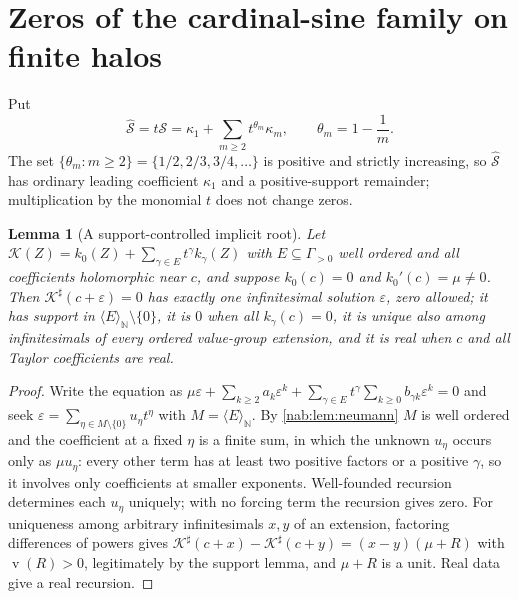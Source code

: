 \documentclass[11pt,letterpaper]{article}
\newtheorem{lemma}[lemma]{Lemma}
\theoremstyle{definition}
\theoremstyle{remark}
\newcommand{\N}{\mathbb N}
\newcommand{\val}{\operatorname{v}}
\newcommand{\angles}[1]{\langle #1\rangle_{\N}}
\numberwithin{equation}{section}
\begin{document}
\section{Zeros of the cardinal-sine family on finite halos}
\label{nab:pl:sec:zeros}

Put
\begin{equation}\label{nab:pl:eq:normalize}
 \widehat{\mathcal S}=t\mathcal S=\kappa_1+\sum_{m\geq2}t^{\theta_m}\kappa_m,
 \qquad\theta_m=1-\frac1m .
\end{equation}
The set $\{\theta_m:m\geq2\}=\{1/2,2/3,3/4,\ldots\}$ is positive and strictly
increasing, so $\widehat{\mathcal S}$ has ordinary leading coefficient
$\kappa_1$ and a positive-support remainder; multiplication by the monomial $t$
does not change zeros.

\begin{lemma}[A support-controlled implicit root]\label{nab:pl:lem:implicit}
Let $\mathcal K(Z)=k_0(Z)+\sum_{\gamma\in E}t^\gamma k_\gamma(Z)$ with
$E\subseteq\Gamma_{>0}$ well ordered and all coefficients holomorphic near $c$,
and suppose $k_0(c)=0$ and $k_0'(c)=\mu\neq0$. Then
$\mathcal K^\sharp(c+\varepsilon)=0$ has exactly one infinitesimal solution
$\varepsilon$, zero allowed; it has support in $\angles E\setminus\{0\}$, it is
$0$ when all $k_\gamma(c)=0$, it is unique also among infinitesimals of every
ordered value-group extension, and it is real when $c$ and all Taylor
coefficients are real.
\end{lemma}

\begin{proof}
Write the equation as
$\mu\varepsilon+\sum_{k\geq2}a_k\varepsilon^k+\sum_{\gamma\in E}t^\gamma
\sum_{k\geq0}b_{\gamma k}\varepsilon^k=0$ and seek
$\varepsilon=\sum_{\eta\in M\setminus\{0\}}u_\eta t^\eta$ with $M=\angles E$.
By \cref{nab:lem:neumann} $M$ is well ordered and the coefficient at a fixed
$\eta$ is a finite sum, in which the unknown $u_\eta$ occurs only as $\mu
u_\eta$: every other term has at least two positive factors or a positive
$\gamma$, so it involves only coefficients at smaller exponents. Well-founded
recursion determines each $u_\eta$ uniquely; with no forcing term the recursion
gives zero. For uniqueness among arbitrary infinitesimals $x,y$ of an
extension, factoring differences of powers gives
$\mathcal K^\sharp(c+x)-\mathcal K^\sharp(c+y)=(x-y)(\mu+R)$ with
$\val(R)>0$, legitimately by the support lemma, and $\mu+R$ is a unit. Real
data give a real recursion.
\end{proof}
\end{document}
